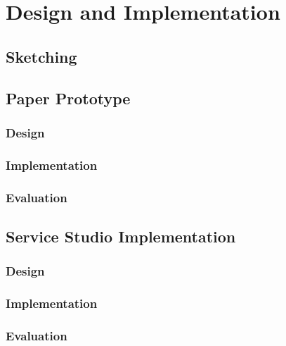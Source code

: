 

\chapter{Design and Implementation}
\label{cha:design_and_implementation}

\section{Sketching}
\label{sec:sketching}

\section{Paper Prototype}
\label{sec:paper_prototype}

\subsection{Design}
\label{subsec:paper_prototype_design}

\subsection{Implementation}
\label{subsec:paper_prototype_implementation}

\subsection{Evaluation}
\label{subsec:paper_prototype_evaluation}


\section{Service Studio Implementation}
\label{sec:service_studio_implementation}

\subsection{Design}
\label{subsec:service_studio_design}

\subsection{Implementation}
\label{subsec:service_studio_implementation}

\subsection{Evaluation}
\label{subsec:service_studio_evaluation}

